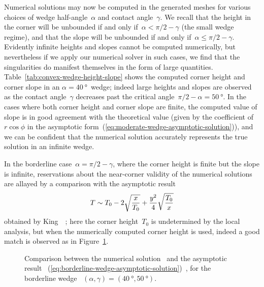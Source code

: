 Numerical solutions may now be computed in the generated meshes
for various choices of wedge half-angle~$\alpha$ and contact angle~$\gamma$.
We recall that the height in the corner will be unbounded
if and only if~$\alpha < \pi/2 - \gamma$ (the small wedge regime),
and that the slope will be unbounded
if and only if~$\alpha \le \pi/2 - \gamma$.
Evidently infinite heights and slopes cannot be computed numerically,
but nevertheless if we apply our numerical solver in such cases,
we find that the singularities do manifest themselves
in the form of large quantities.
Table~\ref{tab:convex-wedge-height-slope}
shows the computed corner height and corner slope
in an $\alpha = \SI{40}{\degree}$~wedge;
indeed large heights and slopes are observed
as the contact angle~$\gamma$
decreases past the critical angle~$\pi/2 - \alpha = \SI{50}{\degree}$.
In the cases where both corner height and corner slope are finite,
the computed value of slope is in good agreement with the theoretical value
(given by the coefficient of~$r \cos\phi$
in the asymptotic form~(\ref{eq:moderate-wedge-asymptotic-solution})),
and we can be confident that the numerical solution
accurately represents the true solution in an infinite wedge.

In the borderline case~$\alpha = \pi/2 - \gamma$,
where the corner height is finite but the slope is infinite,
reservations about the near-corner validity of the numerical solutions
are allayed by a comparison with the asymptotic result
\begin{equation}
  T \sim
    T_0 - 2 \sqrt{\frac{x}{T_0}} + \frac{y^2}{4} \sqrt{\frac{T_0}{x}}
  \label{eq:borderline-wedge-asymptotic-solution}
\end{equation}
obtained by King~\etal~\cite{king-1999-laplace-young-near-corner};
here the corner height~$T_0$ is undetermined by the local analysis,
but when the numerically computed corner height is used,
indeed a good match is observed
as in Figure~\ref{fig:wedge_acute-borderline-asymptotic-comparison}.

\begin{figure}
  \newcommand*{\subfigurewidth}{0.45\textwidth}
  \centering
  \hspace*{\fill}
  \begin{subfigure}[t]{\subfigurewidth}
  \end{subfigure}
    \hfill
  \begin{subfigure}[t]{\subfigurewidth}
  \end{subfigure}
  \hspace*{\fill}
  \caption{
    Comparison between the numerical solution~
    and the asymptotic result~%
      (\ref{eq:borderline-wedge-asymptotic-solution})~,
    for the borderline wedge~%
      $(\alpha, \gamma) = (\SI{40}{\degree}, \SI{50}{\degree})$.
  }
  \label{fig:wedge_acute-borderline-asymptotic-comparison}
\end{figure}

